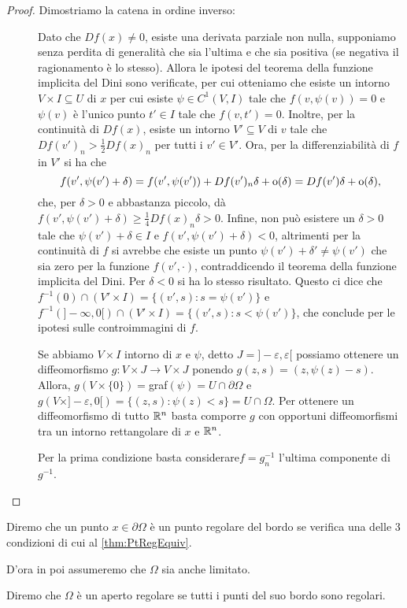 \begin{proof}
	Dimostriamo la catena in ordine inverso:
	\begin{description}
		\item [] Dato che $Df(x)\neq 0$, esiste una derivata parziale non nulla, supponiamo senza perdita di
			generalità che sia l'ultima e che sia positiva (se negativa il ragionamento è lo stesso).
			Allora le ipotesi del teorema della funzione implicita del Dini sono verificate, per cui otteniamo
			che esiste un intorno $V\times I\subseteq U$ di $x$ per cui esiste $\psi\in C^1(V,I)$ tale che $f(v,\psi(v))=0$ e $\psi(v)$
			è l'unico punto $t'\in I$ tale che $f(v,t')=0$.
			Inoltre, per la continuità di $Df(x)$, esiste un intorno $V'\subseteq V$ di $v$ tale che $Df(v')_n>\frac{1}{2}Df(x)_n$ per tutti
			i $v'\in V'$. Ora, per la differenziabilità di $f$ in $V'$ si ha che
			\[
				f(v',\psi(v')+\delta)=f(v', \psi(v'))+Df(v')_n\delta+\mathrm{o}(\delta)=Df(v')\delta+\mathrm{o}(\delta),
			\]
			che, per $\delta>0$ e abbastanza piccolo, dà $f(v',\psi(v')+\delta)\geq \frac{1}{4}Df(x)_n\delta>0$. Infine, non può esistere un $\delta>0$ tale che $\psi(v')+\delta\in I$ e
			$f(v',\psi(v')+\delta)<0$, altrimenti per la continuità di $f$ si avrebbe che esiste un punto $\psi(v')+\delta'\neq \psi(v')$
			che sia zero per la funzione $f(v',\cdot)$, contraddicendo il teorema della funzione implicita del Dini.
			Per $\delta<0$ si ha lo stesso risultato. Questo ci dice che $f^{-1}(0)\cap (V'\times I)=\{(v',s):s=\psi(v')\}$ e
			$f^{-1}(]-\infty,0[)\cap (V'\times I)=\{(v',s):s<\psi(v')\}$, che conclude per le ipotesi sulle controimmagini di $f$.
		\item [] Se abbiamo $V\times I$ intorno di $x$ e $\psi$, detto $J=]-\varepsilon,\varepsilon[$
			possiamo ottenere un diffeomorfismo $g:V\times J \rightarrow V\times J$ ponendo $g(z,s)=(z,\psi(z)-s)$. Allora,
			$g(V\times \{0\})=$graf$(\psi)=U\cap \partial \Omega$ e $g(V\times ]-\varepsilon,0[)=\{(z,s):\psi(z)<s\}=U\cap \Omega$.
			Per ottenere un diffeomorfismo di tutto $\mathbb R^n$ basta comporre $g$ con opportuni diffeomorfismi tra un intorno rettangolare
			di $x$ e $\mathbb R^n$.
		\item [] Per la prima condizione basta considerare$f=g^{-1}_n$ l'ultima componente di $g^{-1}$.
	\end{description}
\end{proof}


\begin{definition}
	Diremo che un punto $x\in \partial \Omega$ è un punto regolare del bordo se verifica una delle $3$ condizioni di cui
	al \cref{thm:PtRegEquiv}.
\end{definition}

D'ora in poi assumeremo che $\Omega$ sia anche limitato.

\begin{definition}
	Diremo che $\Omega$ è un aperto regolare se tutti i punti del suo bordo sono regolari.
\end{definition}


